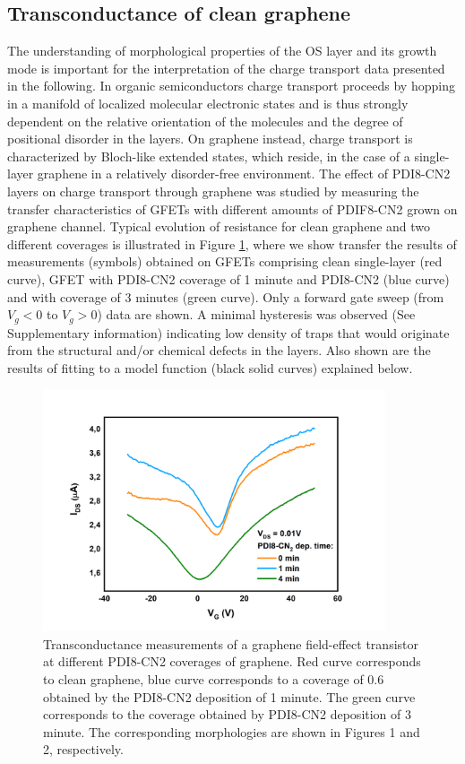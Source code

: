 \documentclass[preprint,aip,jap]{revtex4-2}
\begin{document}
\subsection{Transconductance of clean graphene}
\label{sec:clean}

The understanding of morphological properties of the OS layer and its growth mode is important for the interpretation of the charge transport data presented in the following.  In organic semiconductors charge transport proceeds by hopping in a manifold of localized molecular electronic states and is thus strongly dependent on the relative orientation of the molecules and the degree of positional disorder in the layers.  On graphene instead, charge transport is characterized by Bloch-like extended states, which reside, in the case of a single-layer graphene in a relatively disorder-free environment.  The effect of PDI8-CN2 layers on charge transport through graphene was studied by measuring the transfer characteristics of GFETs with different amounts of PDIF8-CN2 grown on graphene channel. Typical evolution of resistance for clean graphene and  two different coverages is illustrated in Figure \ref{fig:3}, where we show transfer the results of measurements (symbols) obtained on GFETs comprising clean single-layer (red curve), GFET with PDI8-CN2 coverage of 1 minute and PDI8-CN2 (blue curve) and with coverage of 3 minutes (green curve).  Only a forward gate sweep (from $V_g<0$ to $V_g>0$) data are shown. A minimal hysteresis was observed (See Supplementary information) indicating low density of traps that would originate from the structural and/or chemical defects in the layers. Also shown are the results of fitting to a model function (black solid curves) explained below.

\begin{figure}[htb]
  \centering
   \includegraphics[width=0.9\textwidth]{./Figures/fig3}  
  \caption{Transconductance measurements of a graphene field-effect transistor at different PDI8-CN2 coverages of graphene. Red curve corresponds to clean graphene, blue curve corresponds to a coverage of 0.6 obtained by the PDI8-CN2 deposition of 1 minute. The green curve corresponds to the coverage obtained by PDI8-CN2 deposition of 3 minute. The corresponding morphologies are shown in Figures 1 and 2, respectively. }
  \label{fig:3}
\end{figure}
\end{document}
